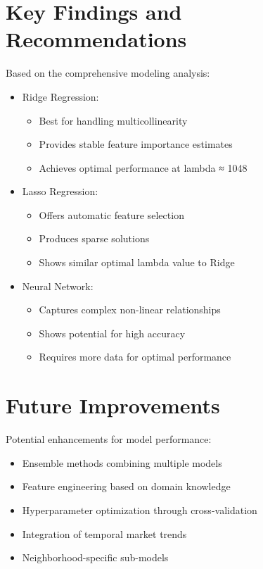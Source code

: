 \documentclass[12pt]{report}
\begin{document}
\section{Key Findings and Recommendations}
Based on the comprehensive modeling analysis:
\begin{itemize}
    \item Ridge Regression:
    \begin{itemize}
        \item Best for handling multicollinearity
        \item Provides stable feature importance estimates
        \item Achieves optimal performance at lambda ≈ 1048
    \end{itemize}
    \item Lasso Regression:
    \begin{itemize}
        \item Offers automatic feature selection
        \item Produces sparse solutions
        \item Shows similar optimal lambda value to Ridge
    \end{itemize}
    \item Neural Network:
    \begin{itemize}
        \item Captures complex non-linear relationships
        \item Shows potential for high accuracy
        \item Requires more data for optimal performance
    \end{itemize}
\end{itemize}

\section{Future Improvements}
Potential enhancements for model performance:
\begin{itemize}
    \item Ensemble methods combining multiple models
    \item Feature engineering based on domain knowledge
    \item Hyperparameter optimization through cross-validation
    \item Integration of temporal market trends
    \item Neighborhood-specific sub-models
\end{itemize}
\end{document}

